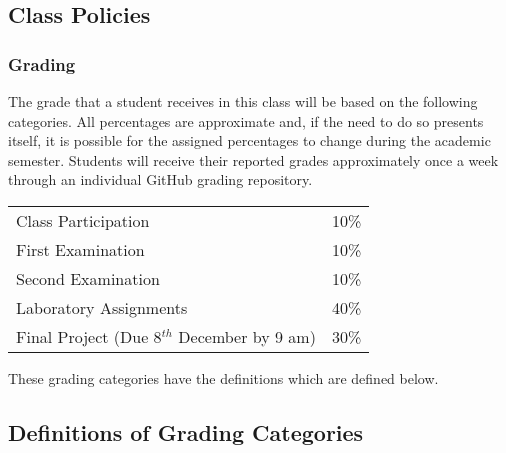 \documentclass[11pt]{article} %
\begin{document}
\subsection*{\textbf{Class Policies}}

\subsubsection*{\textbf{Grading}}

The grade that a student receives in this class will be based on the following categories. All percentages are approximate and, if the need to do so presents itself, it is possible for the assigned percentages to change during the academic semester. Students will receive their reported grades approximately once a week through an individual GitHub grading repository.

\color{red}
\begin{center}
  \begin{tabular}{l|l}
\hline

    Class Participation & 10\% \\  
    First Examination & 10\% \\
    Second Examination & 10\% \\
    Laboratory  Assignments & 40\% \\
    Final Project (Due 8$^{th}$ December by 9 am) & 30\% \\

\hline
  \end{tabular}
\end{center}
\color{black}
\noindent
These grading categories have the definitions which are defined below.


\noindent
\subsection*{\textbf{Definitions of Grading Categories}}
\vspace*{-.05in}
\end{document}
